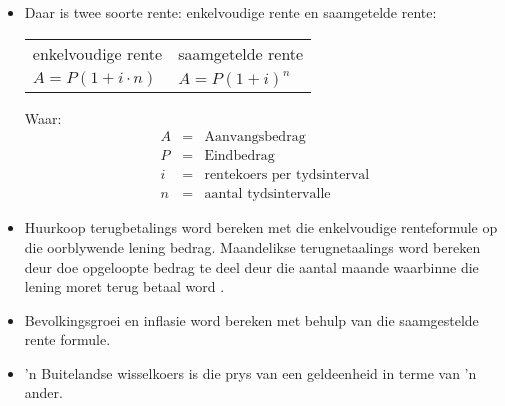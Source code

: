 \begin{itemize}
    \item Daar is twee soorte rente: enkelvoudige rente en saamgetelde rente:\\
    
    \begin{tabularx}{\textwidth}{ XX }
	enkelvoudige rente	&	saamgetelde rente\\
	$A = P (1 + i \cdot n)$	&	$A = P(1 + i)^n$\\
    \end{tabularx}
    \par
    Waar:
    \begin{eqnarray*}
	A &=& \text{Aanvangsbedrag}\\
	P &=& \text{Eindbedrag}\\
	i &=& \text{rentekoers per tydsinterval}\\
	n &=& \text{aantal tydsintervalle}
    \end{eqnarray*}

    \item Huurkoop terugbetalings word bereken met die enkelvoudige renteformule op die oorblywende lening bedrag. Maandelikse terugnetaalings word bereken deur doe opgeloopte bedrag te deel deur die aantal maande waarbinne die lening moret terug betaal word .

    \item Bevolkingsgroei en inflasie word bereken met behulp van die saamgestelde rente formule.

    \item ’n Buitelandse wisselkoers is die prys van een geldeenheid in terme van ’n ander.
\end{itemize}




